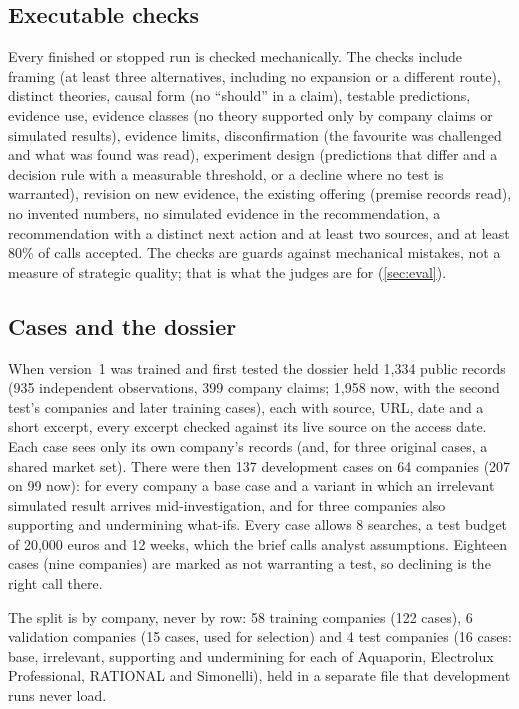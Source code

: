 \subsection{Executable checks}
Every finished or stopped run is checked mechanically. The checks include framing (at least three alternatives,
including no expansion or a different route), distinct theories, causal form (no ``should'' in a claim), testable
predictions, evidence use, evidence classes (no theory supported only by company claims or simulated results),
evidence limits, disconfirmation (the favourite was challenged and what was found was read), experiment design
(predictions that differ and a decision rule with a measurable threshold, or a decline where no test is warranted),
revision on new evidence, the existing offering (premise records read), no invented numbers, no simulated evidence in
the recommendation, a recommendation with a distinct next action and at least two sources, and at least 80\% of calls
accepted. The checks are guards against mechanical mistakes, not a measure of strategic quality; that is what the
judges are for (\cref{sec:eval}).

\subsection{Cases and the dossier}
When version~1 was trained and first tested the dossier held 1{,}334 public records (935 independent observations, 399
company claims; 1{,}958 now, with the second test's companies and later training cases), each with source, URL, date
and a short excerpt, every excerpt checked against its live source on the access date. Each case sees only its own
company's records (and, for three original cases, a shared market set). There were then 137 development cases on 64 companies (207 on 99 now):
for every company a base case and a variant in which an irrelevant simulated result arrives mid-investigation, and for
three companies also supporting and undermining what-ifs. Every case allows 8 searches, a test budget of 20{,}000 euros
and 12 weeks, which the brief calls analyst assumptions. Eighteen cases (nine companies) are marked as not warranting a
test, so declining is the right call there.

The split is by company, never by row: 58 training companies (122 cases), 6 validation companies (15 cases, used for
selection) and 4 test companies (16 cases: base, irrelevant, supporting and undermining for each of Aquaporin, Electrolux
Professional, RATIONAL and Simonelli), held in a separate file that development runs never load.
